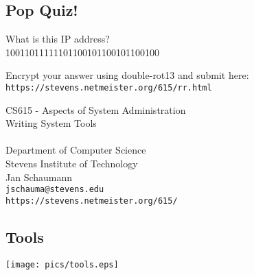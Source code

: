 \documentclass[xga]{xdvislides}
\begin{document}
\setfontphv

\lhead{\slidetitle}                               %
\cfoot{\relax}                               %
\rfoot{\Gray{\today}}

\subsection{Pop Quiz!}
\Huge
What is this IP address? \\

\vspace{.5in}
10011011111101100101100101100100 \\
\vspace{.5in}

Encrypt your answer using double-rot13
and submit here: \\

\verb+https://stevens.netmeister.org/615/rr.html+
\Normalsize

\newpage

\vspace*{\fill}
\begin{center}
	\Hugesize
		CS615 - Aspects of System Administration\\ [1em]
		Writing System Tools\\ [1em]

	\hspace*{5mm}\blueline\\ [1em]
	\Normalsize
		Department of Computer Science\\
		Stevens Institute of Technology\\
		Jan Schaumann\\
		\verb+jschauma@stevens.edu+\\
		\verb+https://stevens.netmeister.org/615/+
\end{center}
\vspace*{\fill}

\subsection{Tools}
\vspace*{\fill}
\begin{center}
	\texttt{[image: pics/tools.eps]}
\end{center}
\vspace*{\fill}
\end{document}
